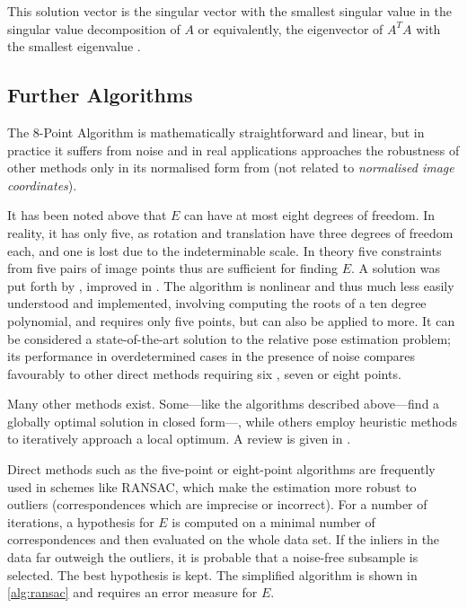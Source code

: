 This solution vector is the singular
vector with the smallest singular value in the singular value decomposition of
$A$ or equivalently, the eigenvector of $A^TA$ with the smallest eigenvalue
\citep[see][]{hartley1997}.

\subsection{Further Algorithms}

The 8-Point Algorithm is mathematically straightforward and linear, but in
practice it suffers from noise \citep[see][]{luong1993} and in real
applications approaches the robustness of other methods only in its normalised
form from \citep{hartley1997} (not related to \emph{normalised image
coordinates}).

It has been noted above that $E$ can have at most eight degrees of freedom. In
reality, it has only five, as rotation and translation have three degrees of
freedom each, and one is lost due to the indeterminable scale. In theory five
constraints from five pairs of image points thus are sufficient for finding $E$.
A solution was put forth by \citet{nister2004}, improved in
\citep{stewenius-engels-nister2006}. The algorithm is nonlinear and
thus much less easily understood and implemented, involving computing the roots
of a ten degree polynomial, and requires only five points, but can also be
applied to more. It can be considered a state-of-the-art solution to the
relative pose estimation problem; its performance in overdetermined cases in the
presence of noise compares favourably to other
direct methods requiring six \citep{pizarro2003}, seven or eight points.

Many other methods exist. Some---like the algorithms described above---find a
globally optimal solution in closed form---, while others employ heuristic
methods to iteratively approach a local optimum. A review is given in \citep{zhang1998}.

Direct methods such as the five-point or eight-point algorithms are frequently
used in schemes like RANSAC, which make the estimation more robust to outliers
(correspondences which are imprecise or incorrect). For a number of iterations,
a hypothesis for $E$ is computed on a minimal number of correspondences and then
evaluated on the whole data set. If the inliers in the data far outweigh the
outliers, it is probable that a noise-free subsample is selected. The best hypothesis is kept.
The simplified algorithm is shown in \autoref{alg:ransac}
\citep[c.f.][ch. 4.8]{h&z2004} and requires an error measure for $E$.


